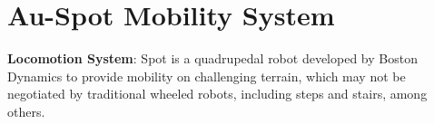 \documentclass[letterpaper, 10pt, conference]{ieeeconf}      %
\newcommand{\ph}[1]{{\textbf{#1}:}} %
\newcommand{\rev}[1]{{\color{blue}#1}} %
\begin{document}

\section{Au-Spot Mobility System}\label{sec:spot}
\ph{Locomotion System} 
Spot is a quadrupedal robot developed by Boston Dynamics to provide mobility on challenging terrain, which may not be negotiated by traditional wheeled robots, including steps and stairs, among others.

\end{document}

